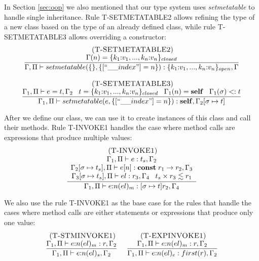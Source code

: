 In Section \ref{sec:oop} we also mentioned that our type system
uses \emph{setmetatable} to handle single inheritance.
Rule \textsc{T-SETMETATABLE2} allows refining the type of a new
class based on the type of an already defined class,
while rule \textsc{T-SETMETATABLE3} allows overriding a constructor:
\[
\begin{array}{c}
\begin{array}{c}
\mylabel{T-SETMETATABLE2}\\
\dfrac{\env(n) = \{k_{1}{:}v_{1}, ..., k_{n}{:}v_{n}\}_{closed}}
      {\env, \penv \vdash setmetatable(\{\}, \{[``\string_\string_index"] = n\}):\{k_{1}{:}v_{1}, ..., k_{n}{:}v_{n}\}_{open}, \env}
\end{array}
\\ \\
\begin{array}{c}
\mylabel{T-SETMETATABLE3}\\
\dfrac{\env_{1}, \penv \vdash e = t, \env_{2} \;\;\;
       t = \{k_{1}{:}v_{1}, ..., k_{n}{:}v_{n}\}_{closed} \;\;\;
       \env_{1}(n) = \Self \;\;\; \env_{1}(\sigma) \subtype t}
      {\env_{1}, \penv \vdash setmetatable(e, \{[``\string_\string_index"] = n\}):\Self, \env_{2}[\sigma \mapsto t]}
\end{array}
\end{array}
\]

After we define our class, we can use it to create instances
of this class and call their methods.
Rule \textsc{T-INVOKE1} handles the case where method calls
are expressions that produce multiple values:
\[
\begin{array}{c}
\; (\textsc{T-INVOKE1})\\
\dfrac{\begin{array}{c}
       \Gamma_{1}, \Pi \vdash e:t_{s}, \Gamma_{2}\\
       \Gamma_{2}[\sigma \mapsto t_{s}], \Pi \vdash e[n]:\mathbf{const} \; r_{1} \rightarrow r_{2}, \Gamma_{3}\\
       \Gamma_{3}[\sigma \mapsto t_{s}], \Pi \vdash el:r_{3}, \Gamma_{4} \;\;\;
       t_{s} \times r_{3} \lesssim r_{1}
       \end{array}}
      {\Gamma_{1}, \Pi \vdash e{:}n(el)_{m}:[\sigma \mapsto t]r_{2}, \Gamma_{4}}
\end{array}
\]

We also use the rule \textsc{T-INVOKE1} as the base case for the rules
that handle the cases where method calls are either statements
or expressions that produce only one value:
\[
\begin{array}{c}
\begin{array}{c}
\; (\textsc{T-STMINVOKE1})\\
\dfrac{\Gamma_{1}, \Pi \vdash e{:}n(el)_{m}:r, \Gamma_{2}}
      {\Gamma_{1}, \Pi \vdash e{:}n(el)_{s},\Gamma_{2}}
\end{array}
\;
\begin{array}{c}
\; (\textsc{T-EXPINVOKE1})\\
\dfrac{\Gamma_{1}, \Pi \vdash e{:}n(el)_{m}:r, \Gamma_{2}}
      {\Gamma_{1}, \Pi \vdash e{:}n(el)_{e}:first(r), \Gamma_{2}}
\end{array}
\end{array}
\]

